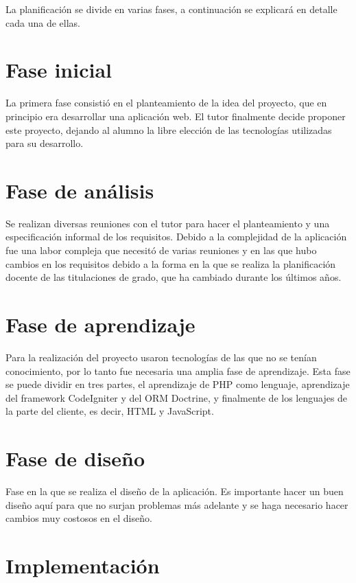 
La planificación se divide en varias fases, a continuación se explicará en detalle cada una de ellas.

\section{Fase inicial}

La primera fase consistió en el planteamiento de la idea del proyecto, que en principio era desarrollar una aplicación web. El tutor finalmente decide proponer este proyecto, dejando al alumno la libre elección de las tecnologías utilizadas para su desarrollo.

\section{Fase de análisis}

Se realizan diversas reuniones con el tutor para hacer el planteamiento y una especificación informal de los requisitos. Debido a la complejidad de la aplicación fue una labor compleja que necesitó de varias reuniones y en las que hubo cambios en los requisitos debido a la forma en la que se realiza la planificación docente de las titulaciones de grado, que ha cambiado durante los últimos años.

\section{Fase de aprendizaje}

Para la realización del proyecto usaron tecnologías de las que no se tenían conocimiento, por lo tanto fue necesaria una amplia fase de aprendizaje. Esta fase se puede dividir en tres partes, el aprendizaje de PHP como lenguaje, aprendizaje del framework CodeIgniter y del ORM Doctrine, y finalmente de los lenguajes de la parte del cliente, es decir, HTML y JavaScript.

\section{Fase de diseño}

Fase en la que se realiza el diseño de la aplicación. Es importante hacer un buen diseño aquí para que no surjan problemas más adelante y se haga necesario hacer cambios muy costosos en el diseño.

\section{Implementación}


